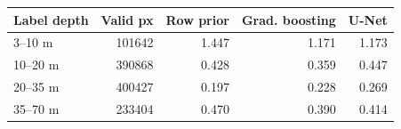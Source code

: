 \begin{tabular}{lrrrr}
\toprule
Label depth & Valid px & Row prior & Grad. boosting & U-Net \\
\midrule
3--10 m & 101642 & 1.447 & 1.171 & 1.173 \\
10--20 m & 390868 & 0.428 & 0.359 & 0.447 \\
20--35 m & 400427 & 0.197 & 0.228 & 0.269 \\
35--70 m & 233404 & 0.470 & 0.390 & 0.414 \\
\bottomrule
\end{tabular}
